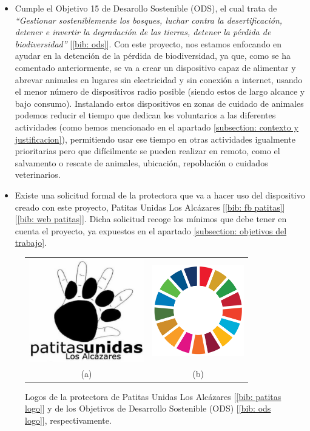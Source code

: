 \documentclass[12pt]{article}
\begin{document}
	\begin{itemize}
		\item Cumple el Objetivo 15 de Desarollo Sostenible (ODS), el cual trata de \textit{``Gestionar sosteniblemente los bosques, luchar contra la desertificación, detener e invertir la degradación de las tierras, detener la pérdida de biodiversidad''} [\ref{bib: ods}]. Con este proyecto, nos estamos enfocando en ayudar en la detención de la pérdida de biodiversidad, ya que, como se ha comentado anteriormente, se va a crear un dispositivo capaz de alimentar y abrevar animales en lugares sin electricidad y sin conexión a internet, usando el menor número de dispositivos radio posible (siendo estos de largo alcance y bajo consumo). Instalando estos dispositivos en zonas de cuidado de animales podemos reducir el tiempo que dedican los voluntarios a las diferentes actividades (como hemos mencionado en el apartado \ref{subsection: contexto y justificacion}), permitiendo usar ese tiempo en otras actividades igualmente prioritarias pero que difícilmente se pueden realizar en remoto, como el salvamento o rescate de animales, ubicación, repoblación o cuidados veterinarios. 
		\item Existe una solicitud formal de la protectora que va a hacer uso del dispositivo creado con este proyecto, Patitas Unidas Los Alcázares [\ref{bib: fb patitas}] [\ref{bib: web patitas}]. Dicha solicitud recoge los mínimos que debe tener en cuenta el proyecto, ya expuestos en el apartado \ref{subsection: objetivos del trabajo}.
	\end{itemize}
	
	\begin{figure} [h!]
		\begin{center}
			\begin{tabular}{cc}
				\includegraphics[width=50mm]{img/patitas_logo.jpg} &   \includegraphics[width=40mm]{img/ODS_logo.png} \\
				(a)  & (b) \\ [10pt]
			\end{tabular}
			\caption{Logos de la protectora de Patitas Unidas Los Alcázares [\ref{bib: patitas logo}] y de los Objetivos de Desarrollo Sostenible (ODS) [\ref{bib: ods logo}], respectivamente.}
			\label{Estado del arte: logos}
		\end{center}
	\end{figure}
\end{document}
